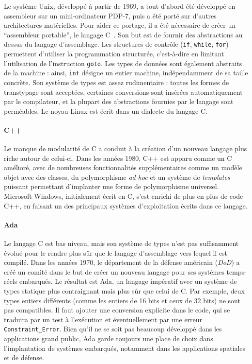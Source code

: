 Le système Unix, développé à partir de 1969, a tout d'abord été développé en
assembleur sur un mini-ordinateur PDP-7, puis a été porté sur d'autres
architectures matérielles. Pour aider ce portage, il a été nécessaire de créer
un ``assembleur portable'', le langage C~\cite{KandR,AnsiC}. Son but est de
fournir des abstractions au dessus du langage d'assemblage. Les structures de
contrôle (\texttt{if}, \texttt{while}, \texttt{for}) permettent d'utiliser la
programmation structurée, c'est-à-dire en limitant l'utilisation de
l'instruction \texttt{goto}. Les types de données sont également abstraits de la
machine : ainsi, \texttt{int} désigne un entier machine, indépendamment de sa
taille concrète. Son système de types est assez rudimentaire : toutes les formes
de transtypage sont acceptées, certaines conversions sont insérées
automatiquement par le compilateur, et la plupart des abstractions fournies par
le langage sont perméables. Le noyau Linux est écrit dans un dialecte du langage
C.

\paragraph{C++}

Le manque de modularité de C a conduit à la création d'un nouveau langage plus
riche autour de celui-ci. Dans les années 1980, C++ est apparu comme un C
amélioré, avec de nombreuses fonctionnalités supplémentaires comme un modèle
objet avec des classes, du polymorphisme \emph{ad hoc} et un système de
\emph{templates} puissant permettant d'implanter une forme de polymorphisme
universel. Microsoft Windows, initialement écrit en C, s'est enrichi de plus en
plus de code C++, en faisant un des principaux systèmes d'exploitation écrits
dans ce langage.


\paragraph{Ada}

Le langage C est bas niveau, mais son système de types n'est pas suffisamment
évolué pour le rendre plus sûr que le langage d'assemblage vers lequel il est
compilé. Dans les années 1970, le département de la défense américain
(\emph{DoD}) a créé un comité dans le but de créer un nouveau langage pour ses
systèmes temps-réels embarqués. Le résultat est Ada, un langage impératif avec
un système de types statique plus contraignant mais plus sûr que celui de C. Par
exemple, deux types entiers différents (comme les entiers de 16 bits et ceux de
32 bits) ne sont pas compatibles. Il faut ajouter une conversion explicite dans
le code, qui se traduira par un test à l'exécution et éventuellement par une
erreur \texttt{Constraint\_Error}. Bien qu'il ne se soit pas beaucoup développé
dans les applications grand public, Ada garde toujours une place de choix dans
l'implantation de systèmes embarqués, notamment dans les applications spatiales
et de défense.

